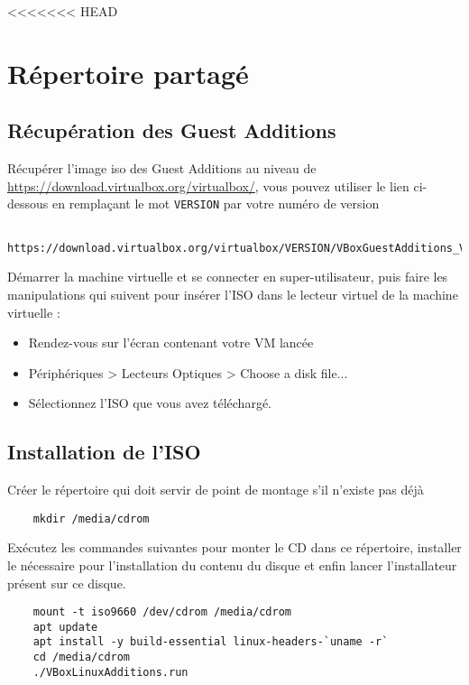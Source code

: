 <<<<<<< HEAD
\chapter{Répertoire partagé}

\section{Récupération des Guest Additions}

Récupérer l'image iso des Guest Additions au niveau de \href{https://download.virtualbox.org/virtualbox/}{https://download.virtualbox.org/virtualbox/}, vous pouvez utiliser le lien ci-dessous en remplaçant le mot \texttt{VERSION} par votre numéro de version

\begin{lstlisting}
	https://download.virtualbox.org/virtualbox/VERSION/VBoxGuestAdditions_VERSION.iso
\end{lstlisting}

Démarrer la machine virtuelle et se connecter en super-utilisateur, puis faire les manipulations qui suivent pour insérer l'ISO dans le lecteur virtuel de la machine virtuelle :
\begin{itemize}
	\item Rendez-vous sur l'écran contenant votre VM lancée
	\item Périphériques > Lecteurs Optiques > Choose a disk file...
	\item Sélectionnez l'ISO que vous avez téléchargé.
\end{itemize}

\section{Installation de l'ISO}

Créer le répertoire qui doit servir de point de montage s'il n'existe pas déjà

\begin{lstlisting}
	mkdir /media/cdrom
\end{lstlisting}

Exécutez les commandes suivantes pour monter le CD dans ce répertoire, installer le nécessaire pour l'installation du contenu du disque et enfin lancer l'installateur présent sur ce disque.

\begin{lstlisting}
	mount -t iso9660 /dev/cdrom /media/cdrom
	apt update
	apt install -y build-essential linux-headers-`uname -r`
	cd /media/cdrom
	./VBoxLinuxAdditions.run
\end{lstlisting}


